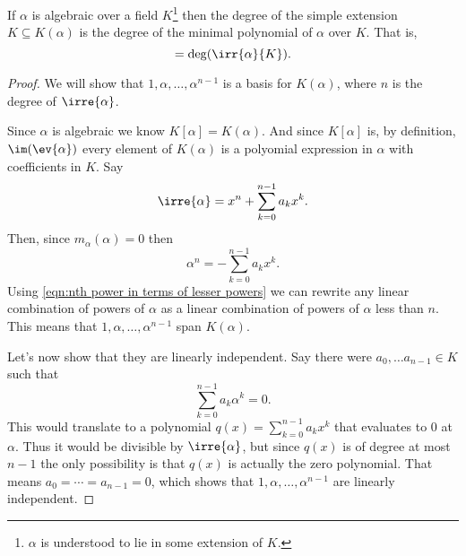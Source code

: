 \documentclass[12pt,oneside]{book}
\begin{document}
\begin{proposition} \label{prop:degree of a simple
	extension}
	If \( \alpha \) is algebraic over a field \( K \)\footnote{\( \alpha \) is understood to
	lie in some extension of \( K \).} then the degree of the simple extension \( K
	\subseteq K(\alpha)	\) is the degree of the minimal polynomial of \( \alpha \) over \( K
	\). That is,
	\begin{equation*}
		[K(\alpha) \colon K] = \deg(\irr{\alpha}{K}).
	\end{equation*}
\end{proposition}
\begin{proof}
	We will show that \( 1, \alpha, \dots, \alpha^{n-1} \) is a basis for \( K(\alpha) \),
	where \( n \) is the degree of \( \irre{\alpha} \).

	Since \( \alpha \) is algebraic we know \( K[\alpha] = K(\alpha) \). And since \(
	K[\alpha]	\) is, by definition, \( \im(\ev{\alpha}) \) every element of \( K(\alpha) \)
	is a polyomial expression in \( \alpha \) with coefficients in \( K \). Say
	\begin{equation*}
		\irre{\alpha} = x^n + \sum_{k = 0}^{n-1}a_k x^k.
	\end{equation*}
	Then, since \( m_{\alpha}(\alpha) = 0 \) then
	\begin{equation} \label{eqn:nth power in terms of lesser powers}
		\alpha^n = - \sum_{k = 0}^{n-1}a_k x^k.
	\end{equation}
	Using \cref{eqn:nth power in terms of lesser powers} we can rewrite any linear combination
	of powers of \( \alpha \) as a linear combination of powers of \( \alpha \) less than \(
	n \). This means that \( 1, \alpha, \dots, \alpha^{n-1} \) span \( K(\alpha) \). 

	Let's now show that they are linearly independent. Say there were \( a_0, \dots a_{n-1}
	\in K \) such that
	\begin{equation*}
		\sum_{k = 0}^{n-1} a_k \alpha^k = 0.
	\end{equation*}
	This would translate to a polynomial \( q(x) = \sum_{k = 0}^{n-1} a_k x^k  \) that
	evaluates to \( 0 \) at \( \alpha \). Thus it would be divisible by \( \irre{\alpha} \),
	but since \( q(x) \) is of degree at most \( n-1 \) the only possibility is that \( q(x)
	\) is actually the zero polynomial. That means \( a_0 = \cdots = a_{n-1} = 0 \), which
	shows that \( 1, \alpha, \dots, \alpha^{n-1} \) are linearly independent.
\end{proof}
\end{document}
